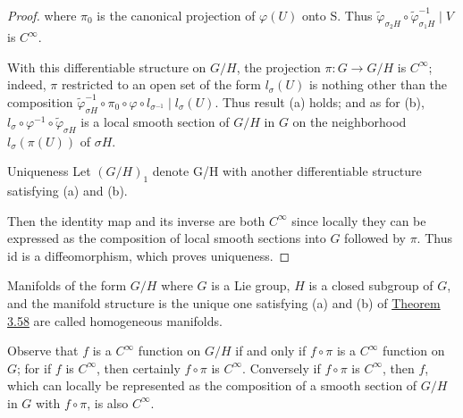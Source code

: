 \begin{proof}
where  $ \pi_0 $ is the canonical projection of  $ \varphi(U) $ onto S. Thus  $ \widetilde{\varphi}_{\sigma_2H} \circ \widetilde{\varphi}_{\sigma_1H}^{-1} \mid V $ is  $ C^\infty $.

With this differentiable structure on $G/H$, the projection $\pi: G \to G/H$ is $C^\infty$; indeed, $\pi$ restricted to an open set of the form $l_{\sigma}(U)$ is nothing other than the composition $\tilde{\varphi}_{\sigma H}^{-1}\circ\pi_{0}\circ\varphi\circ l_{\sigma^{-1}}\mid l_{\sigma}(U)$. Thus result (a) holds; and as for (b), $l_{\sigma}\circ\varphi^{-1}\circ\tilde{\varphi}_{\sigma H}$ is a local smooth section of $G/H$ in $G$ on the neighborhood $l_{\sigma}(\pi(U))$ of $\sigma H$.

Uniqueness Let  $ (G/H)_{1} $ denote G/H with another differentiable structure satisfying (a) and (b).

\begin{center}
\end{center}

Then the identity map and its inverse are both $C^{\infty}$ since locally they can be expressed as the composition of local smooth sections into $G$ followed by $\pi$. Thus id is a diffeomorphism, which proves uniqueness.

\end{proof}

\begin{definition}\label{thm:3.59}
Manifolds of the form $G/H$ where $G$ is a Lie group, $H$ is a closed subgroup of $G$, and the manifold structure is the unique one satisfying (a) and (b) of \hyperref[thm:3.58]{Theorem 3.58} are called homogeneous manifolds.

\end{definition}

\begin{remarks}\label{thm:3.60}
Observe that $f$ is a $C^{\infty}$ function on $G/H$ if and only if $f\circ\pi$ is a $C^{\infty}$ function on $G$; for if $f$ is $C^{\infty}$, then certainly $f\circ\pi$ is $C^{\infty}$. Conversely if $f\circ\pi$ is $C^{\infty}$, then $f$, which can locally be represented as the composition of a smooth section of $G/H$ in $G$ with $f\circ\pi$, is also $C^{\infty}$.

\end{remarks}

